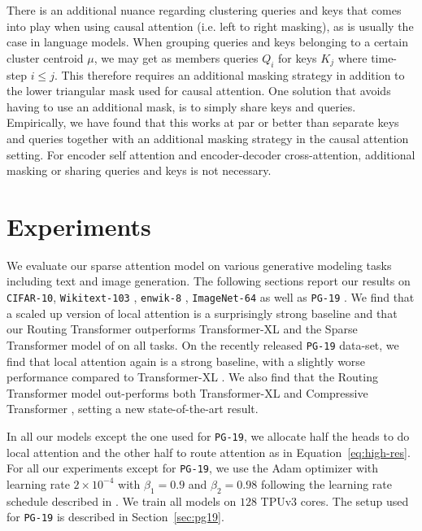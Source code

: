 There is an additional nuance regarding clustering queries and keys that comes into play when using causal attention (i.e. left to right masking), as is usually the case in language models. When grouping queries and keys belonging to a certain cluster centroid \(\mu\), we may get as members queries \(Q_i\) for keys \(K_j\) where time-step \(i \le j\). This therefore requires an additional masking strategy in addition to the lower triangular mask used for causal attention. One solution that avoids having to use an additional mask, is to simply share keys and queries. Empirically, we have found that this works at par or better than separate keys and queries together with an additional masking strategy in the causal attention setting. For encoder self attention and encoder-decoder cross-attention, additional masking or sharing queries and keys is not necessary.

\section{Experiments}\label{sec:experiments}
We evaluate our sparse attention model on various generative modeling tasks including text and image generation. The following sections report our results on \texttt{CIFAR-10}, \texttt{Wikitext-103} \citep{merity2016pointer},
\texttt{enwik-8} \citep{mahoney2011large}, \texttt{ImageNet-64} 
as well as \texttt{PG-19} \cite{rae2020compressive}. We find that a scaled up version of local attention is a surprisingly strong baseline and that our Routing Transformer outperforms Transformer-XL \citep{dai2019transformer} and the Sparse Transformer model of
\citet{child2019generating} on all tasks. On the recently released \texttt{PG-19} data-set, we find that local attention again is a strong baseline, with a slightly worse performance compared to Transformer-XL \citep{dai2019transformer}. We also find that the Routing Transformer model out-performs both Transformer-XL \citep{dai2019transformer} and Compressive Transformer \citep{rae2020compressive}, setting a new state-of-the-art result. 

In all our models except the one used for \texttt{PG-19}, we allocate half the heads to do local attention and the other half to route attention as in Equation~\ref{eq:high-res}.
For all our experiments except for \texttt{PG-19},
we use the Adam optimizer \citep{adam} with learning rate \(2\times 10^{-4}\) with
\(\beta_1 = 0.9\) and \(\beta_2 = 0.98\) following the learning rate schedule described in \citet{vaswani2017attention}. We train all models on \(128\) TPUv3 cores. The setup used for \texttt{PG-19} is described in Section~\ref{sec:pg19}.

